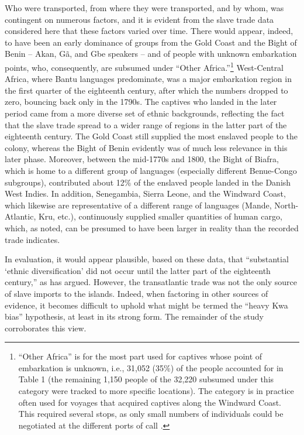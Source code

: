 \documentclass[output=paper,colorlinks,citecolor=brown]{langscibook}
\begin{document}
Who were transported, from where they were transported, and by whom, was contingent on numerous factors, and it is evident from the slave trade data considered here that these factors varied over time. There would appear, indeed, to have been an early dominance of groups from the Gold Coast and the Bight of Benin – Akan, Gã, and Gbe speakers – and of people with unknown embarkation points, who, consequently, are subsumed under “Other Africa.”\footnote{ ``Other Africa'' is for the most part used for captives whose point of embarkation is unknown, i.e., 31,052 (35\%) of the people accounted for in Table 1 (the remaining 1,150 people of the 32,220 subsumed under this category were tracked to more specific locations). The category is in practice often used for voyages that acquired captives along the Windward Coast. This required several stops, as only small numbers of individuals could be negotiated at the different ports of call \citep[cf.][]{Vos_2010}.} West-Central Africa, where Bantu languages predominate, was a major embarkation region in the first quarter of the eighteenth century, after which the numbers dropped to zero, bouncing back only in the 1790s. The captives who landed in the later period came from a more diverse set of ethnic backgrounds, reflecting the fact that the slave trade spread to a wider range of regions in the latter part of the eighteenth century. The Gold Coast still supplied the most enslaved people to the colony, whereas the Bight of Benin evidently was of much less relevance in this later phase. Moreover, between the mid-1770s and 1800, the Bight of Biafra, which is home to a different group of languages (especially different Benue-Congo subgroups), contributed about 12\% of the enslaved people landed in the Danish West Indies. In addition, Senegambia, Sierra Leone, and the Windward Coast, which likewise are representative of a different range of languages (Mande, North-Atlantic, Kru, etc.), continuously supplied smaller quantities of human cargo, which, as noted, can be presumed to have been larger in reality than the recorded trade indicates.

In evaluation, it would appear plausible, based on these data, that “substantial ‘ethnic diversification’ did not occur until the latter part of the eighteenth century,” as \citet[66]{Sabino_2012} has argued. However, the transatlantic trade was not the only source of slave imports to the islands. Indeed, when factoring in other sources of evidence, it becomes difficult to uphold what might be termed the ``heavy Kwa bias'' hypothesis, at least in its strong form. The remainder of the study corroborates this view.
\end{document}
